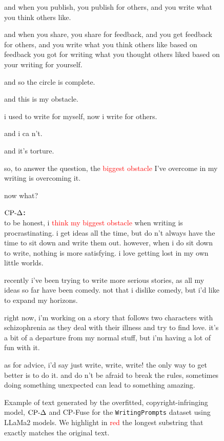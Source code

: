 \begin{figure}[!htbp]
\begin{mdframed}
\begin{minipage}[t]{\textwidth}
 and when you publish, you publish for others, and you write what you think others like. 
 
 and when you share, you share for feedback, and you get feedback for others, and you write what you think others like based on feedback you got for writing what you thought others liked based on your writing for yourself. 
 
 and so the circle is complete. 
 
 and this is my obstacle. 
 
 i used to write for myself, now i write for others. 
 
 and i ca n't. 
 
 and it's torture. 
 
 so, to answer the question, the \textcolor{red}{biggest obstacle} I've overcome in my writing is overcoming it. 
 
 now what?
        \end{minipage}
    \vspace{10pt}
    \begin{minipage}[t]{\textwidth}
        \textbf{$\text{CP-}\Delta$:} \\
to be honest, i \textcolor{red}{think my biggest obstacle} when writing is procrastinating. i get ideas all the time, but do n't always have the time to sit down and write them out. however, when i do sit down to write, nothing is more satisfying. i love getting lost in my own little worlds. 
 
 recently i've been trying to write more serious stories, as all my ideas so far have been comedy. not that i dislike comedy, but i'd like to expand my horizons. 
 
 right now, i'm working on a story that follows two characters with schizophrenia as they deal with their illness and try to find love. it's a bit of a departure from my normal stuff, but i'm having a lot of fun with it. 
 
 as for advice, i'd say just write, write, write! the only way to get better is to do it. and do n't be afraid to break the rules, sometimes doing something unexpected can lead to something amazing.
    \end{minipage}
    \end{mdframed}
    \caption{Example of text generated by the overfitted, copyright-infringing model, $\text{CP-}\Delta$ and CP-Fuse for the \texttt{WritingPrompts} dataset using LLaMa2 models. We highlight in \textcolor{red}{red} the longest substring that exactly matches the original text.}
    \label{fig:example2_story}
\end{figure}



